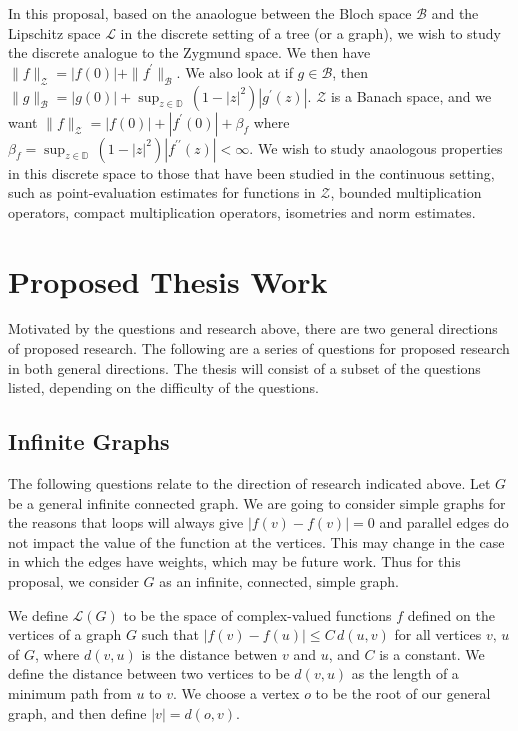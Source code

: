 \documentclass[11 pt]{report}
\theoremstyle{definition}
\theoremstyle{definition}
\newcommand{\LG}{\mathcal{L}(G)}
\begin{document}
\indent In this proposal, based on the anaologue between the Bloch space $\mathcal{B}$ and the Lipschitz space $\mathcal{L}$ in the discrete setting of a tree (or a graph), we wish to study the discrete analogue to the Zygmund space. We then have $\|f\|_{\mathcal{Z}} = |f(0)| + \|f^\prime\|_{\mathcal{B}}$. We also look at if $g \in \mathcal{B}$, then $\displaystyle \|g\|_\mathcal{B} = |g(0)|+\sup_{z \in \mathbb{D}}\, (1 - |z|^2)|g^\prime (z)|$. $\mathcal{Z}$ is a Banach space, and we want $\displaystyle \|f\|_\mathcal{Z} = |f(0)|+|f^\prime(0)| + \beta_f$ where $\beta_f = \sup_{z \in \mathbb{D}} \, (1-|z|^2)|f^{\prime\prime}(z)|<\infty$.  We wish to study anaologous properties in this discrete space to those that have been studied in the continuous setting, such as point-evaluation estimates for functions in $\mathcal{Z}$, bounded multiplication operators, compact multiplication operators, isometries and norm estimates.


\chapter{Proposed Thesis Work}

\indent \indent Motivated by the questions and research above, there are two general directions of proposed research. The following are a series of questions for proposed research in both general directions. The thesis will consist of a subset of the questions listed, depending on the difficulty of the questions. 

\section{Infinite Graphs}

\indent \indent The following questions relate to the direction of research indicated above. Let $G$ be a general infinite connected graph. We are going to consider simple graphs for the reasons that loops will always give $|f(v)-f(v)|=0$ and parallel edges do not impact the value of the function at the vertices. This may change in the case in which the edges have weights, which may be future work. Thus for this proposal, we consider $G$ as an infinite, connected, simple graph.

 \indent We define $\LG$ to be the space of complex-valued functions $f$ defined on the vertices of a graph $G$ such that $|f(v) - f(u)| \le C\, d(u,v)$ for all vertices $v, \, u$ of $G$, where $d(v,u)$ is the distance betwen $v$ and $u$, and $C$ is a constant. We define the distance between two vertices to be $d(v,u)$ as the length of a minimum path from $u$ to $v$. We choose a vertex $o$ to be the root of our general graph, and then define $|v| = d(o,v)$. 
\end{document}
